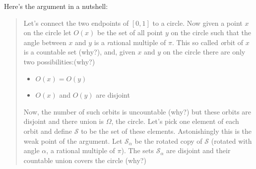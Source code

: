\documentclass[twoside,11pt,a4paper]{article}
\newif\ifEN \ENtrue	                %
\newif\ifVITALI\VITALItrue              %
\def\tr|#1|#2|{\ifEN #2\else #1\fi}     %
\theoremstyle{definition}
\begin{document}
\begin{remark}
\begin{enumerate}
    \ifVITALI\par
    \tr|Hier ist das Argumtent in voller Kürze: | Here's the argument in a nutshell:|
    \begin{quote}
      \tr|Verbinden wir zunächst die beiden Endpunkte des Intervalls $[0,1]$ zu einem Kreis (um zu verhindern, dass das Verschieben von Teilmengen aus $\Omega$ herausführt). 
          Für einen gegebenen Punkt $x$ auf dem Kreis sei $O(x)$ die Menge aller Punkte $y$ auf dem Kreis, die mit $x$ einen Winkel einschliesst, der ein \emph{rationales Vielfaches
          von $\pi$} ist. Dieses sogenannte \emph{Orbit} von $x$ ist eine abzählbare Menge (warum?) und für $x$ und $y$ auf dem Kreis gibt es nur zwei Möglichkeiten (warum?): 
         |Let's connect the two endpoints of $[0,1]$ to a circle. 
          Now given a point $x$ on the circle let $O(x)$ be the set of all point $y$ on the circle such that the angle between $x$ and $y$ is a \emph{rational multiple of $\pi$}. 
          This so called \emph{orbit} of $x$ is a countable set (why?), and, given $x$ and $y$ on the circle there are only two possibilities:(why?) |
      \begin{itemize}
      \item $O(x)=O(y)$
      \item $O(x)$ \tr|und | and | $O(y) $ \tr|sind disjunkt|are disjoint|
      \end{itemize}
      \tr|Die Anzahl solcher Orbits ist überabzählbar (warum?) und diese Orbits sind disjunkt und ihre Vereinigung ist $\Omega$, der Kreis.
          Wählen wir aus jedem Orbit ein Element und nennen die Menge dieser Elemente $\mathcal{S}$. Erstaunlicherweise ist das der Schwachpunkt des Arguments.
          Sei $\mathcal{S}_\alpha$ die um den Winkel $\alpha$ gedrehte Kopie von $\mathcal{S}$, wobei $\alpha$ wieder ein rationales Vielfaches von $\pi$ ist. 
          Die Mengen $\mathcal{S}_\alpha$ sind disjunkt und ihre abzählbare Vereinigung überdeckt den Kreis (warum?).
         |Now, the number of such orbits is uncountable (why?) but these orbits are disjoint and there union is $\Omega$, the circle. 
          Let's pick one element of each orbit and define $\mathcal{S}$ to be the set of these elements. Astonishingly this is the weak point of the argument.
          Let $\mathcal{S}_\alpha$ be the rotated copy of $\mathcal S$ (rotated with angle $\alpha$, a rational multiple of $\pi$). 
          The sets $\mathcal{S}_\alpha$ are disjoint and their countable union covers the circle (why?) |
          \par

\end{quote}
\end{enumerate}
\end{remark}
\end{document}
